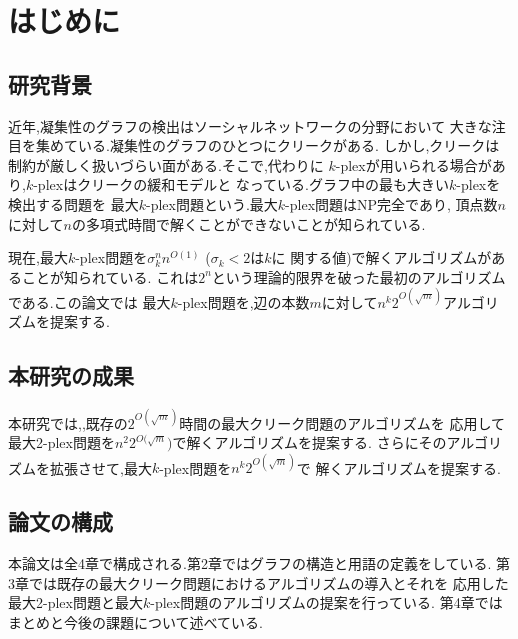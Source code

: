 \documentclass{thesis}
\theoremstyle{definition}
\begin{document}
\baselineskip=22pt
\pagestyle{empty}

\maketitle

\pagestyle{myheadings}	%
\tableofcontents

\newpage


\chapter{はじめに}

\section{研究背景}
近年,凝集性のグラフの検出はソーシャルネットワークの分野において
大きな注目を集めている.凝集性のグラフのひとつにクリークがある.
しかし,クリークは制約が厳しく扱いづらい面がある.そこで,代わりに
$k$-plexが用いられる場合があり,$k$-plexはクリークの緩和モデルと
なっている.グラフ中の最も大きい$k$-plexを検出する問題を
最大$k$-plex問題という.最大$k$-plex問題はNP完全であり,
頂点数$n$に対して$n$の多項式時間で解くことができないことが知られている.

現在,最大$k$-plex問題を$\sigma_{k}^{n}n^{O(1) }$ ($\sigma_{k} < 2$は$k$に
関する値)で解くアルゴリズムがあることが知られている. \cite{xiao2017fast} 
これは$2^{n}$という理論的限界を破った最初のアルゴリズムである.この論文では
最大$k$-plex問題を,辺の本数$m$に対して$n^{k }2^{O(\sqrt{m})}$アルゴリズムを提案する.

\section{本研究の成果}
本研究では,,既存の$2^{O(\sqrt{m})}$時間の最大クリーク問題のアルゴリズムを
応用して最大2-plex問題を$n^{2}2^{O(\sqrt{m}})$で解くアルゴリズムを提案する.
さらにそのアルゴリズムを拡張させて,最大$k$-plex問題を$n^{k }2^{O(\sqrt{m})}$で
解くアルゴリズムを提案する.

\section{論文の構成}
本論文は全4章で構成される.第2章ではグラフの構造と用語の定義をしている.
第3章では既存の最大クリーク問題におけるアルゴリズムの導入とそれを
応用した最大2-plex問題と最大$k$-plex問題のアルゴリズムの提案を行っている.
第4章ではまとめと今後の課題について述べている.
\end{document}
